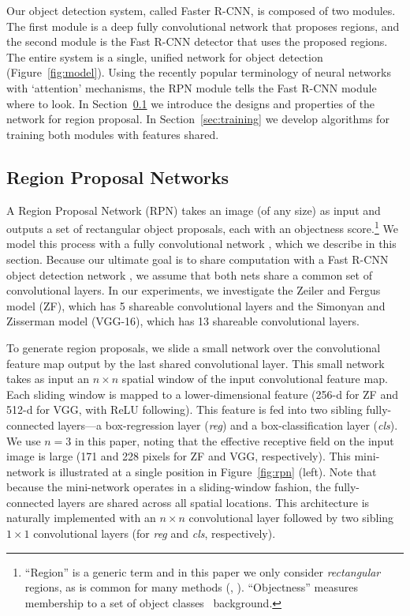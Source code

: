 \documentclass[10pt,journal,cspaper,compsoc]{IEEEtran}
\begin{document}
Our object detection system, called Faster R-CNN, is composed of two modules. The first module is a deep fully convolutional network that proposes regions, and the second module is the Fast R-CNN detector \cite{Girshick2015a} that uses the proposed regions. The entire system is a single, unified network for object detection (Figure~\ref{fig:model}).
Using the recently popular terminology of neural networks with `attention' \cite{Chorowski2015} mechanisms, the RPN module tells the Fast R-CNN module where to look.
In Section~\ref{sec:rpn} we introduce the designs and properties of the network for region proposal. In Section~\ref{sec:training} we develop algorithms for training both modules with features shared.

\subsection{Region Proposal Networks}
\label{sec:rpn}

A Region Proposal Network (RPN) takes an image (of any size) as input and outputs a set of rectangular object proposals, each with an objectness score.\footnote{``Region'' is a generic term and in this paper we only consider \emph{rectangular} regions, as is common for many methods (\eg, \cite{Szegedy2014a,Uijlings2013,Zitnick2014}). ``Objectness'' measures membership to a set of object classes \vs~background.}
We model this process with a fully convolutional network \cite{Long2015}, which we describe in this section.
Because our ultimate goal is to share computation with a Fast R-CNN object detection network \cite{Girshick2015a}, we assume that both nets share a common set of convolutional layers.
In our experiments, we investigate the Zeiler and Fergus model \cite{Zeiler2014} (ZF), which has 5 shareable convolutional layers and the Simonyan and Zisserman model \cite{Simonyan2015} (VGG-16), which has 13 shareable convolutional layers.

To generate region proposals, we slide a small network over the convolutional feature map output by the last shared convolutional layer.
This small network takes as input an $n \times n$ spatial window of the input convolutional feature map.
Each sliding window is mapped to a lower-dimensional feature (256-d for ZF and 512-d for VGG, with ReLU \cite{Nair2010} following).
This feature is fed into two sibling fully-connected layers---a box-regression layer (\emph{reg}) and a box-classification layer (\emph{cls}).
We use $n=3$ in this paper, noting that the effective receptive field on the input image is large (171 and 228 pixels for ZF and VGG, respectively).
This mini-network is illustrated at a single position in Figure~\ref{fig:rpn} (left).
Note that because the mini-network operates in a sliding-window fashion, the fully-connected layers are shared across all spatial locations.
This architecture is naturally implemented with an $n \times n$ convolutional layer followed by two sibling $1 \times 1$ convolutional layers (for \emph{reg} and \emph{cls}, respectively). %
\end{document}
